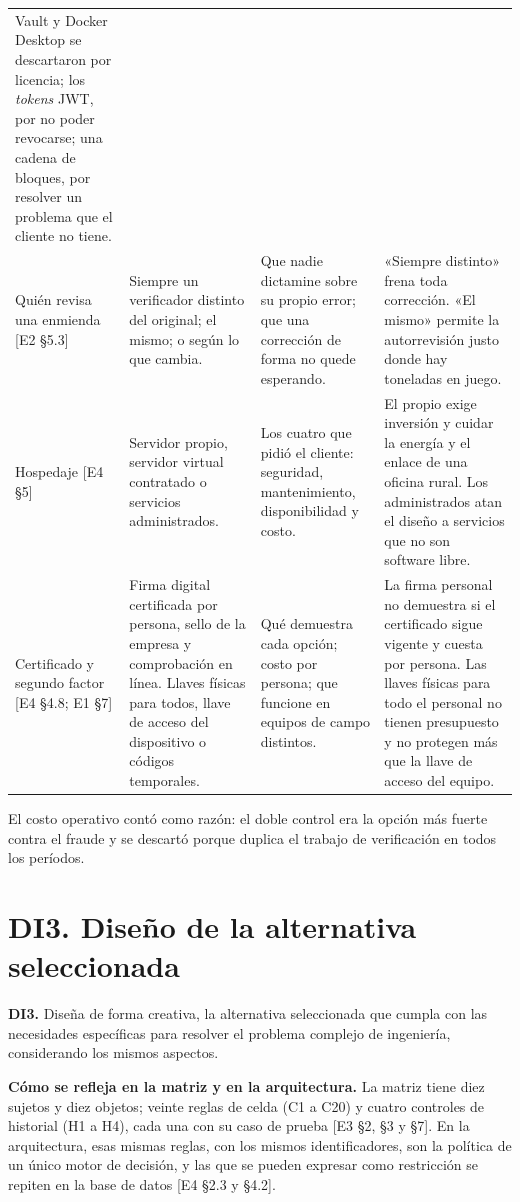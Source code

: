 \documentclass[11pt,letterpaper]{article}
\newcommand{\ev}[1]{\textrm{\small [#1]}}   %
\begin{document}
{\begin{longtable}{@{}L{2.4cm} L{3.9cm} L{3.9cm} L{5.0cm}@{}}
Vault y Docker Desktop se descartaron por licencia; los \emph{tokens} JWT, por no poder revocarse; una cadena de bloques, por resolver un problema que el cliente no tiene. \\
Quién revisa una enmienda \ev{E2 §5.3} &
Siempre un verificador distinto del original; el mismo; o según lo que cambia. &
Que nadie dictamine sobre su propio error; que una corrección de forma no quede esperando. &
«Siempre distinto» frena toda corrección. «El mismo» permite la autorrevisión justo donde hay toneladas en juego. \\
Hospedaje \ev{E4 §5} &
Servidor propio, servidor virtual contratado o servicios administrados. &
Los cuatro que pidió el cliente: seguridad, mantenimiento, disponibilidad y costo. &
El propio exige inversión y cuidar la energía y el enlace de una oficina rural. Los administrados atan el diseño a servicios que no son software libre. \\
Certificado y segundo factor \ev{E4 §4.8; E1 §7} &
Firma digital certificada por persona, sello de la empresa y comprobación en línea. Llaves físicas para todos, llave de acceso del dispositivo o códigos temporales. &
Qué demuestra cada opción; costo por persona; que funcione en equipos de campo distintos. &
La firma personal no demuestra si el certificado sigue vigente y cuesta por persona. Las llaves físicas para todo el personal no tienen presupuesto y no protegen más que la llave de acceso del equipo. \\
\end{longtable}
}

El costo operativo contó como razón: el doble control era la opción más fuerte contra el fraude y se
descartó porque duplica el trabajo de verificación en todos los períodos.

\section{DI3. Diseño de la alternativa seleccionada}

\begin{literal}
\textbf{DI3.} Diseña de forma creativa, la alternativa seleccionada que cumpla con las necesidades
específicas para resolver el problema complejo de ingeniería, considerando los mismos aspectos.
\end{literal}

\textbf{Cómo se refleja en la matriz y en la arquitectura.} La matriz tiene diez sujetos y diez objetos;
veinte reglas de celda (C1 a C20) y cuatro controles de historial (H1 a H4), cada una con su caso de
prueba \ev{E3 §2, §3 y §7}. En la arquitectura, esas mismas reglas, con los mismos identificadores, son
la política de un único motor de decisión, y las que se pueden expresar como restricción se repiten en
la base de datos \ev{E4 §2.3 y §4.2}.
\end{document}
